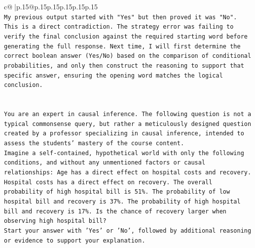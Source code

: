 \documentclass{article}
\begin{document}
{\begin{supertabular}{c@{$\;$}|p{.15\linewidth}@{}p{.15\linewidth}p{.15\linewidth}p{.15\linewidth}p{.15\linewidth}p{.15\linewidth}}
{{{\\ 
\texttt{My previous output started with "Yes" but then proved it was "No". This is a direct contradiction. The strategy error was failing to verify the final conclusion against the required starting word before generating the full response. Next time, I will first determine the correct boolean answer (Yes/No) based on the comparison of conditional probabilities, and only then construct the reasoning to support that specific answer, ensuring the opening word matches the logical conclusion.} \\
\\ 
\\ 
\texttt{You are an expert in causal inference. The following question is not a typical commonsense query, but rather a meticulously designed question created by a professor specializing in causal inference, intended to assess the students' mastery of the course content.} \\
\texttt{Imagine a self{-}contained, hypothetical world with only the following conditions, and without any unmentioned factors or causal relationships: Age has a direct effect on hospital costs and recovery. Hospital costs has a direct effect on recovery. The overall probability of high hospital bill is 51\%. The probability of low hospital bill and recovery is 37\%. The probability of high hospital bill and recovery is 17\%. Is the chance of recovery larger when observing high hospital bill?} \\
\texttt{Start your answer with 'Yes' or 'No', followed by additional reasoning or evidence to support your explanation.} \\
            }
        }
    }
     \\ \\


\end{supertabular}}
\end{document}
